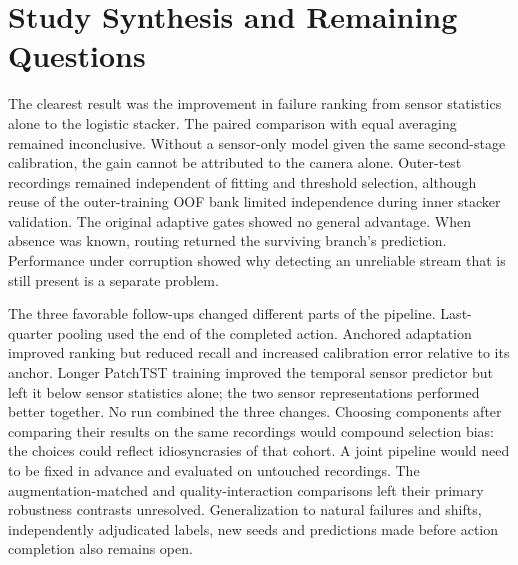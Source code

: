 \section{Study Synthesis and Remaining Questions}
The clearest result was the improvement in failure ranking from sensor statistics alone to the logistic stacker. The paired comparison with equal averaging remained inconclusive. Without a sensor-only model given the same second-stage calibration, the gain cannot be attributed to the camera alone. Outer-test recordings remained independent of fitting and threshold selection, although reuse of the outer-training OOF bank limited independence during inner stacker validation. The original adaptive gates showed no general advantage. When absence was known, routing returned the surviving branch's prediction. Performance under corruption showed why detecting an unreliable stream that is still present is a separate problem.

The three favorable follow-ups changed different parts of the pipeline. Last-quarter pooling used the end of the completed action. Anchored adaptation improved ranking but reduced recall and increased calibration error relative to its anchor. Longer PatchTST training improved the temporal sensor predictor but left it below sensor statistics alone; the two sensor representations performed better together. No run combined the three changes. Choosing components after comparing their results on the same recordings would compound selection bias: the choices could reflect idiosyncrasies of that cohort. A joint pipeline would need to be fixed in advance and evaluated on untouched recordings. The augmentation-matched and quality-interaction comparisons left their primary robustness contrasts unresolved. Generalization to natural failures and shifts, independently adjudicated labels, new seeds and predictions made before action completion also remains open.
